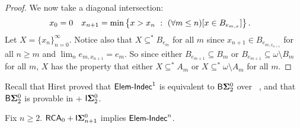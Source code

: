 \begin{proof}
We now take a diagonal intersection:
\begin{align*}
  x_0 &= 0 & x_{n+1} &= \min\left\{x>x_n\ :\ (\forall m\leq n)[x\in B_{e_{m,x}}]\right\}.
\end{align*}
Let $X = \{x_n\}_{n=0}^\infty$.
Notice also that $X \subseteq^*B_{e_m}$ for all $m$ since
$x_{n+1} \in B_{e_{m,x_{n+1}}}$ for all $n\geq m$ and $\lim_n e_{m,x_{n+1}}=e_m$.
So since either $B_{e_{m+1}}\subseteq B_m$ or $B_{e_{m+1}} \subseteq \omega\setminus B_m$
for all $m$, $X$ has the property that either $X \subseteq^*A_m$ or
$X \subseteq^* \omega\setminus A_m$ for all $m$.
\end{proof}

Recall that Hirst proved that $\mathsf{Elem{\mbox{-}}Indec}^1$ is equivalent to $\mathsf{B}{\mathbf{\Sigma}^0_2}$ over \RCAo\ \cite{Hirst:thesis},
and that $\mathsf{B}{\mathbf{\Sigma}^0_2}$ is provable in \RCAo+ $\mathsf{I}{\mathbf{\Sigma}^0_2}$.

\begin{thm}\label{T:EIndec&Ind}
Fix $n\geq 2$.
$\mathsf{RCA}_0+\mathsf{I}{\mathbf{\Sigma}^0_{n+1}}$ implies $\mathsf{Elem{\mbox{-}}Indec}^n$.
\end{thm}

